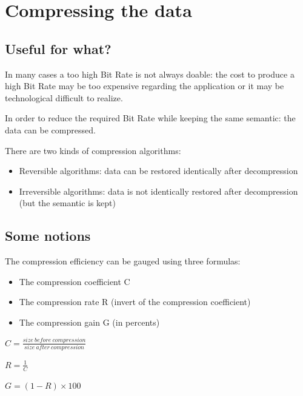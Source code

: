 \documentclass{beamer}[10pt, usepdftitle=false, handout]
\begin{document}
	\section{Compressing the data}

	\subsection{Useful for what?}
	\begin{frame}
	
	In many cases a too high Bit Rate is not always doable: the cost to produce a high Bit Rate may be too expensive regarding the application or it may be technological difficult to realize. 
	\vspace*{0.5em}	
	
	In order to reduce the required Bit Rate while keeping the same semantic: the data can be compressed.\vspace*{0.5em}	
	
	There are two kinds of compression algorithms: 
	\vspace*{1em}	

	\begin{itemize}
	\item{Reversible algorithms: data can be restored identically after decompression}
	\item{Irreversible algorithms: data is not identically restored after decompression (but the semantic is kept)}
	\end{itemize}

	\end{frame}

	\subsection{Some notions}

	\begin{frame}
	
	The compression efficiency can be gauged using three formulas:
	\vspace*{1em}	
	
	\begin{itemize}
	\item{The compression coefficient C}
	\item{The compression rate R (invert of the compression coefficient)}
	\item{The compression gain G (in percents)}	
	\end{itemize}	
	\vspace*{1em}		
	
	$C=\frac{size\ before\ compression}{size\ after\ compression}$
	
	$R=\frac{1}{C}$
	
	$G=(1-R)\times 100$	
		
	\end{frame}	
\end{document}
